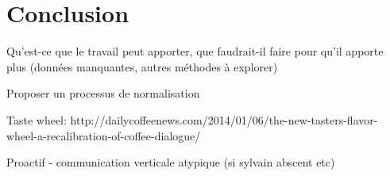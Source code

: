 

\chapter{Conclusion}
Qu'est-ce que le travail peut apporter, que faudrait-il faire pour qu'il apporte plus (données manquantes, autres méthodes à explorer) 

Proposer un processus de normalisation

Taste wheel: http://dailycoffeenews.com/2014/01/06/the-new-tasters-flavor-wheel-a-recalibration-of-coffee-dialogue/


Proactif - communication verticale atypique (si sylvain abscent etc)

